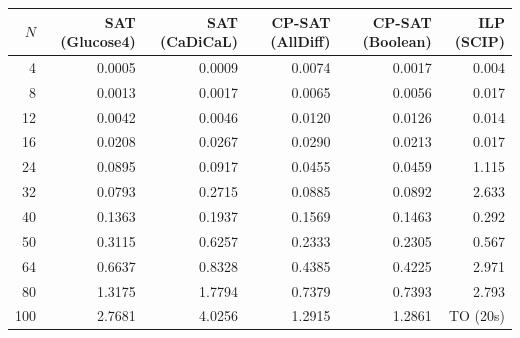 \begin{tabular}{r|rrrrr}
\hline
$N$ & SAT (Glucose4) & SAT (CaDiCaL) & CP-SAT (AllDiff) & CP-SAT (Boolean) & ILP (SCIP) \\
\hline
   4 &     0.0005 &     0.0009 &     0.0074 &     0.0017 &      0.004 \\
   8 &     0.0013 &     0.0017 &     0.0065 &     0.0056 &      0.017 \\
  12 &     0.0042 &     0.0046 &     0.0120 &     0.0126 &      0.014 \\
  16 &     0.0208 &     0.0267 &     0.0290 &     0.0213 &      0.017 \\
  24 &     0.0895 &     0.0917 &     0.0455 &     0.0459 &      1.115 \\
  32 &     0.0793 &     0.2715 &     0.0885 &     0.0892 &      2.633 \\
  40 &     0.1363 &     0.1937 &     0.1569 &     0.1463 &      0.292 \\
  50 &     0.3115 &     0.6257 &     0.2333 &     0.2305 &      0.567 \\
  64 &     0.6637 &     0.8328 &     0.4385 &     0.4225 &      2.971 \\
  80 &     1.3175 &     1.7794 &     0.7379 &     0.7393 &      2.793 \\
 100 &     2.7681 &     4.0256 &     1.2915 &     1.2861 &   TO (20s) \\
\hline
\end{tabular}
